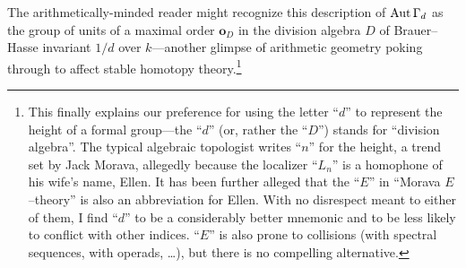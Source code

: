 \begin{remark}
The arithmetically-minded reader might recognize this description of $\operatorname{Aut} \Gamma_d$ as the group of units of a maximal order $\mathbf o_D$ in the division algebra $D$ of Brauer--Hasse invariant $1/d$ over $k$---another glimpse of arithmetic geometry poking through to affect stable homotopy theory.\footnote{This finally explains our preference for using the letter ``$d$'' to represent the height of a formal group---the ``$d$'' (or, rather the ``$D$'') stands for ``division algebra''.  The typical algebraic topologist writes ``$n$'' for the height, a trend set by Jack Morava, allegedly because the localizer ``$L_n$'' is a homophone of his wife's name, Ellen.  It has been further alleged that the ``$E$'' in ``Morava $E$--theory'' is also an abbreviation for Ellen.  With no disrespect meant to either of them, I find ``$d$'' to be a considerably better mnemonic and to be less likely to conflict with other indices.  ``$E$'' is also prone to collisions (with spectral sequences, with operads, \ldots), but there is no compelling alternative.}
\end{remark}

